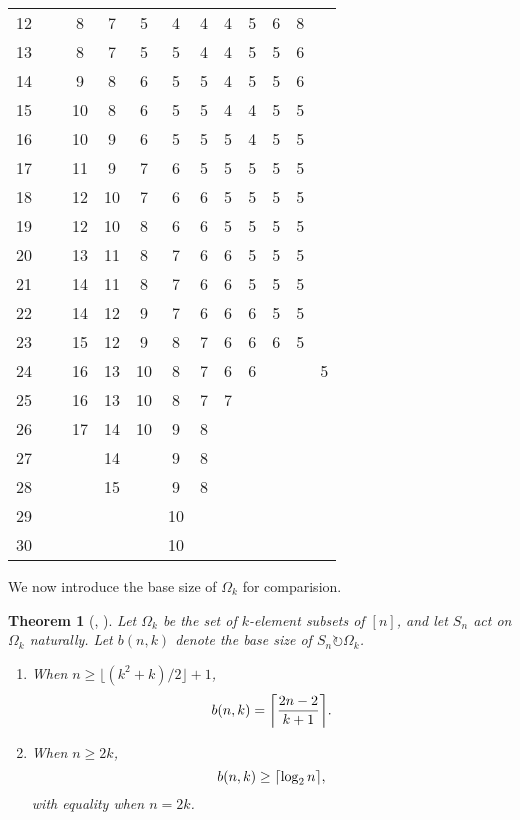\documentclass[12pt,twoside]{reedthesis}
\theoremstyle{plain}   %
\newtheorem{thm}{Theorem}[section] %
\theoremstyle{definition}
\theoremstyle{remark}
\numberwithin{equation}{section}
\def\acts{\circlearrowright} %
\DeclarePairedDelimiter\ceil{\lceil}{\rceil}
\begin{document}
\begin{table}[htbp]
\begin{center}
\begin{tabular}{c  c c c c c c c c c c c}
        12 & ~ & 8 & 7 & 5 & 4 & 4 & 4 & 5 & 6 & 8 & ~ \\ 
        13 & ~ & 8 & 7 & 5 & 5 & 4 & 4 & 5 & 5 & 6 & ~ \\ 
        14 & ~ & 9 & 8 & 6 & 5 & 5 & 4 & 5 & 5 & 6 & ~ \\ 
        15 & ~ & 10 & 8 & 6 & 5 & 5 & 4 & 4 & 5 & 5 & ~ \\ 
        16 & ~ & 10 & 9 & 6 & 5 & 5 & 5 & 4 & 5 & 5 & ~ \\ 
        17 & ~ & 11 & 9 & 7 & 6 & 5 & 5 & 5 & 5 & 5 & ~ \\ 
        18 & ~ & 12 & 10 & 7 & 6 & 6 & 5 & 5 & 5 & 5 & ~ \\ 
        19 & ~ & 12 & 10 & 8 & 6 & 6 & 5 & 5 & 5 & 5 & ~ \\ 
        20 & ~ & 13 & 11 & 8 & 7 & 6 & 6 & 5 & 5 & 5 & ~ \\ 
        21 & ~ & 14 & 11 & 8 & 7 & 6 & 6 & 5 & 5 & 5 & ~ \\ 
        22 & ~ & 14 & 12 & 9 & 7 & 6 & 6 & 6 & 5 & 5 & ~ \\ 
        23 & ~ & 15 & 12 & 9 & 8 & 7 & 6 & 6 & 6 & 5 & ~ \\ 
        24 & ~ & 16 & 13 & 10 & 8 & 7 & 6 & 6 & ~ & ~ & 5 \\ 
        25 & ~ & 16 & 13 & 10 & 8 & 7 & 7 & ~ & ~ & ~ & ~ \\ 
        26 & ~ & 17 & 14 & 10 & 9 & 8 & ~ & ~ & ~ & ~ & ~ \\ 
        27 & ~ & ~ & 14 & ~ & 9 & 8 & ~ & ~ & ~ & ~ & ~ \\ 
        28 & ~ & ~ & 15 & ~ & 9 & 8 & ~ & ~ & ~ & ~ & ~ \\ 
        29 & ~ & ~ & ~ & ~ & 10 & ~ & ~ & ~ & ~ & ~ & ~ \\ 
        30 & ~ & ~ & ~ & ~ & 10 & ~ & ~ & ~ & ~ & ~ & ~ \\ 
\bottomrule %
\end{tabular}
\end{center}
\label{tableone} %
\end{table}
We now introduce the base size of $\Omega_k$ for comparision.
\begin{thm}[{\cite{valle2023}, \cite{spiga23}}]
  Let $\Omega_k$ be the set of $k$-element subsets of $[n]$, and let $S_n$ act on $\Omega_k$ naturally.
  Let $b(n,k)$ denote the base size of $S_n \acts \Omega_k$.
  \begin{enumerate}
  \item When $n \geq \lfloor (k^2 +k) / 2 \rfloor + 1$,
    \[ b(n,k) = \ceil*{ \dfrac{2n - 2}{k +1}}.\]
  \item When $n \geq 2k$,
    \[ b(n,k) \geq \ceil*{ \log_2 n },\]
    with equality when $n = 2k$.
  \end{enumerate}
\end{thm}
\end{document}
